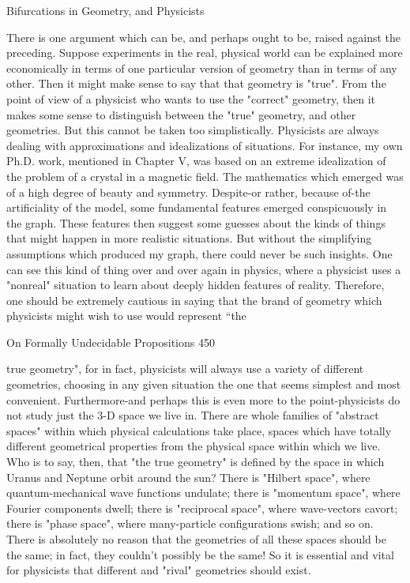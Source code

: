                        Bifurcations in Geometry, and Physicists

There is one argument which can be, and perhaps ought to be, raised against the
preceding. Suppose experiments in the real, physical world can be explained more
economically in terms of one particular version of geometry than in terms of any other.
Then it might make sense to say that that geometry is "true". From the point of view of a
physicist who wants to use the "correct" geometry, then it makes some sense to
distinguish between the "true" geometry, and other geometries. But this cannot be taken
too simplistically. Physicists are always dealing with approximations and idealizations of
situations. For instance, my own Ph.D. work, mentioned in Chapter V, was based on an
extreme idealization of the problem of a crystal in a magnetic field. The mathematics
which emerged was of a high degree of beauty and symmetry. Despite-or rather, because
of-the artificiality of the model, some fundamental features emerged conspicuously in the
graph. These features then suggest some guesses about the kinds of things that might
happen in more realistic situations. But without the simplifying assumptions which
produced my graph, there could never be such insights. One can see this kind of thing
over and over again in physics, where a physicist uses a "nonreal" situation to learn about
deeply hidden features of reality. Therefore, one should be extremely cautious in saying
that the brand of geometry which physicists might wish to use would represent “the




On Formally Undecidable Propositions                                                   450

true geometry", for in fact, physicists will always use a variety of different geometries,
choosing in any given situation the one that seems simplest and most convenient.
        Furthermore-and perhaps this is even more to the point-physicists do not study
just the 3-D space we live in. There are whole families of "abstract spaces" within which
physical calculations take place, spaces which have totally different geometrical
properties from the physical space within which we live. Who is to say, then, that "the
true geometry" is defined by the space in which Uranus and Neptune orbit around the
sun? There is "Hilbert space", where quantum-mechanical wave functions undulate; there
is "momentum space", where Fourier components dwell; there is "reciprocal space",
where wave-vectors cavort; there is "phase space", where many-particle configurations
swish; and so on. There is absolutely no reason that the geometries of all these spaces
should be the same; in fact, they couldn't possibly be the same! So it is essential and vital
for physicists that different and "rival" geometries should exist.

